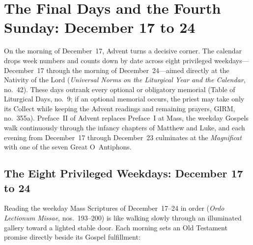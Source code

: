 \section{The Final Days and the Fourth Sunday: December 17 to 24}\label{sec:dec17-24}

On the morning of December~17, Advent turns a decisive corner. The calendar drops week numbers and counts down by date across eight privileged weekdays---December~17 through the morning of December~24---aimed directly at the Nativity of the Lord (\textit{Universal Norms on the Liturgical Year and the Calendar}, no.~42). These days outrank every optional or obligatory memorial (Table of Liturgical Days, no.~9; if an optional memorial occurs, the priest may take only its Collect while keeping the Advent readings and remaining prayers, GIRM, no.~355a). Preface~II of Advent replaces Preface~I at Mass, the weekday Gospels walk continuously through the infancy chapters of Matthew and Luke, and each evening from December~17 through December~23 culminates at the \textit{Magnificat} with one of the seven Great O~Antiphons.

\subsection{The Eight Privileged Weekdays: December 17 to 24}

Reading the weekday Mass Scriptures of December~17--24 in order (\textit{Ordo Lectionum Missae}, nos.~193--200) is like walking slowly through an illuminated gallery toward a lighted stable door. Each morning sets an Old Testament promise directly beside its Gospel fulfillment:

